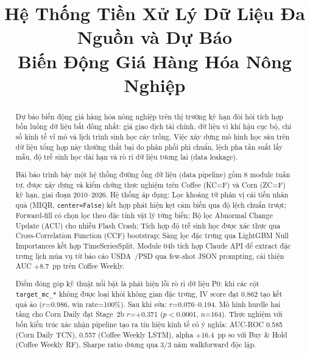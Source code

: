 \documentclass[conference]{IEEEtran}
\begin{document}
\title{Hệ Thống Tiền Xử Lý Dữ Liệu Đa Nguồn và Dự Báo\\
Biến Động Giá Hàng Hóa Nông Nghiệp}

\author{
}

\maketitle

\begin{abstract}
Dự báo biến động giá hàng hóa nông nghiệp trên thị trường kỳ hạn đòi hỏi
tích hợp bốn luồng dữ liệu bất đồng nhất: giá giao dịch tài chính, dữ liệu
vi khí hậu cục bộ, chỉ số kinh tế vĩ mô và lịch trình sinh học cây trồng.
Việc xây dựng mô hình học sâu trên dữ liệu tổng hợp này thường thất bại do
phân phối phi chuẩn, lệch pha tần suất lấy mẫu, độ trễ sinh học dài hạn và
rò rỉ dữ liệu tương lai (data leakage).

Bài báo trình bày một hệ thống đường ống dữ liệu (data pipeline) gồm 8
module tuần tự, được xây dựng và kiểm chứng thực nghiệm trên Coffee (KC=F)
và Corn (ZC=F) kỳ hạn, giai đoạn 2010--2026. Hệ thống áp dụng: Lọc khoảng
tứ phân vị cải tiến nhân quả (MIQR, \texttt{center=False}) kết hợp phát
hiện kẹt cảm biến qua độ lệch chuẩn trượt; Forward-fill có chọn lọc theo
đặc tính vật lý từng biến; Bộ lọc Abnormal Change Update (ACU) cho nhiễu
Flash Crash; Tích hợp độ trễ sinh học được xác thực qua Cross-Correlation
Function (CCF) bootstrap; Sàng lọc đặc trưng qua LightGBM Null Importances
kết hợp TimeSeriesSplit. Module 04b tích hợp Claude API \cite{anthropic2024}
để extract đặc trưng lịch mùa vụ từ báo cáo USDA~\cite{usda_nass}/PSD
\cite{usda_fas} qua few-shot JSON prompting, cải thiện AUC $+$8.7~pp trên
Coffee Weekly.

Điểm đóng góp kỹ thuật nổi bật là phát hiện lỗi rò rỉ dữ liệu P0: khi các
cột \texttt{target\_mc\_*} không được loại khỏi không gian đặc trưng, IV
score đạt 0.862 tạo kết quả ảo ($r$=0.986, win rate=100\%). Sau khi sửa:
$r$=0.076--0.194. Mô hình hurdle hai tầng cho Corn Daily đạt Stage~2b
$r$=+0.371 ($p<$0.0001, $n$=164). Thực nghiệm với bốn kiến trúc xác nhận
pipeline tạo ra tín hiệu kinh tế có ý nghĩa: AUC-ROC 0.585 (Corn Daily TCN),
0.557 (Coffee Weekly LSTM), alpha $+$16.4~pp so với Buy \& Hold (Coffee
Weekly RF), Sharpe ratio dương qua 3/3 năm walkforward độc lập.
\end{abstract}
\end{document}
